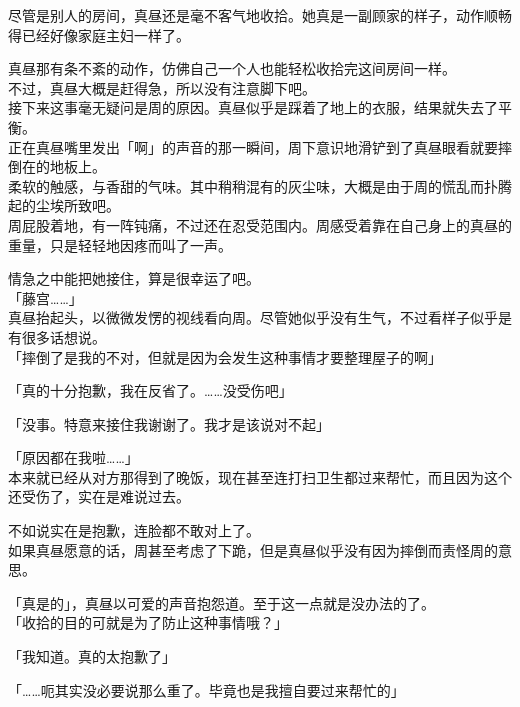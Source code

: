 尽管是别人的房间，真昼还是毫不客气地收拾。她真是一副顾家的样子，动作顺畅得已经好像家庭主妇一样了。

真昼那有条不紊的动作，仿佛自己一个人也能轻松收拾完这间房间一样。\\

不过，真昼大概是赶得急，所以没有注意脚下吧。\\

接下来这事毫无疑问是周的原因。真昼似乎是踩着了地上的衣服，结果就失去了平衡。\\

正在真昼嘴里发出「啊」的声音的那一瞬间，周下意识地滑铲到了真昼眼看就要摔倒在的地板上。\\

柔软的触感，与香甜的气味。其中稍稍混有的灰尘味，大概是由于周的慌乱而扑腾起的尘埃所致吧。\\

周屁股着地，有一阵钝痛，不过还在忍受范围内。周感受着靠在自己身上的真昼的重量，只是轻轻地因疼而叫了一声。

情急之中能把她接住，算是很幸运了吧。\\

「藤宫……」\\

真昼抬起头，以微微发愣的视线看向周。尽管她似乎没有生气，不过看样子似乎是有很多话想说。\\

「摔倒了是我的不对，但就是因为会发生这种事情才要整理屋子的啊」

「真的十分抱歉，我在反省了。……没受伤吧」

「没事。特意来接住我谢谢了。我才是该说对不起」

「原因都在我啦……」\\

本来就已经从对方那得到了晚饭，现在甚至连打扫卫生都过来帮忙，而且因为这个还受伤了，实在是难说过去。

不如说实在是抱歉，连脸都不敢对上了。\\

如果真昼愿意的话，周甚至考虑了下跪，但是真昼似乎没有因为摔倒而责怪周的意思。

「真是的」，真昼以可爱的声音抱怨道。至于这一点就是没办法的了。\\

「收拾的目的可就是为了防止这种事情哦？」

「我知道。真的太抱歉了」

「……呃其实没必要说那么重了。毕竟也是我擅自要过来帮忙的」\\

